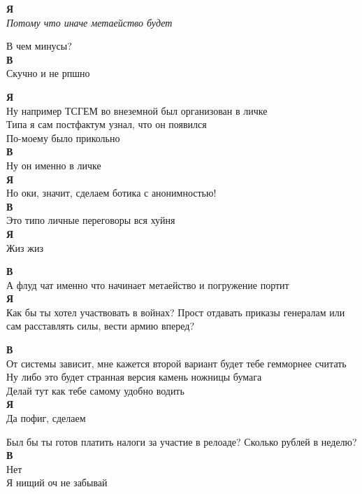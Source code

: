 \textbf{Я} \\
\textit{Потому что иначе метаейство будет}

В чем минусы?\\

\textbf{В} \\
Скучно и не рпшно

\textbf{Я} \\
Ну например ТСГЕМ во внеземной был организован в личке\\

Типа я сам постфактум узнал, что он появился\\

По-моему было прикольно\\

\textbf{В} \\
Ну он именно в личке\\
\textbf{Я} \\
Но оки, значит, сделаем ботика с анонимностью!\\

\textbf{В} \\
Это типо личные переговоры вся хуйня\\

\textbf{Я} \\
Жиз жиз

\textbf{В} \\
А флуд чат именно что начинает метаейство и погружение портит\\

\textbf{Я} \\
Как бы ты хотел участвовать в войнах? Прост отдавать приказы генералам или сам расставлять силы, вести армию вперед?

\textbf{В} \\
От системы зависит, мне кажется второй вариант будет тебе гемморнее считать\\

Ну либо это будет странная версия камень ножницы бумага\\

Делай тут как тебе самому удобно водить\\

\textbf{Я} \\
Да пофиг, сделаем

Был бы ты готов платить налоги за участие в релоаде? Сколько рублей в неделю?
\textbf{В} \\
Нет\\
Я нищий оч не забывай\\

